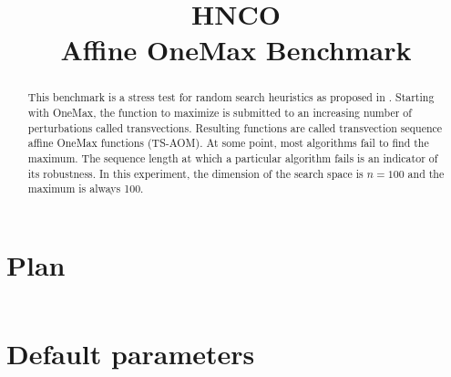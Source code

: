 \documentclass[a4paper]{article}
\begin{document}



\title{HNCO\\
  Affine OneMax Benchmark}
\maketitle

\begin{abstract}
  This benchmark is a stress test for random search heuristics as
  proposed in \cite{10.1145/3449726.3459497}. Starting with OneMax,
  the function to maximize is submitted to an increasing number of
  perturbations called transvections. Resulting functions are called
  transvection sequence affine OneMax functions (TS-AOM). At some
  point, most algorithms fail to find the maximum. The sequence length
  at which a particular algorithm fails is an indicator of its
  robustness. In this experiment, the dimension of the search space is
  $n = 100$ and the maximum is always 100.
\end{abstract}

\tableofcontents



 

\appendix

\section{Plan}

\inputminted[breaklines=true]{json}{pretty.json}

\section{Default parameters}

\inputminted[breaklines=true]{text}{../log.defaults}
\end{document}
